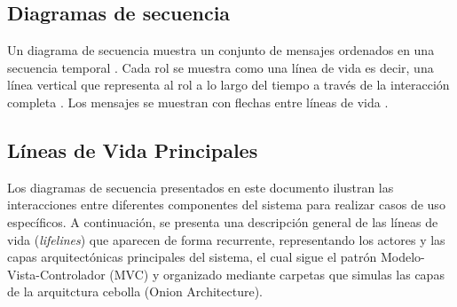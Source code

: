 
\subsection{Diagramas de secuencia}
Un diagrama de secuencia muestra un conjunto de mensajes ordenados en una secuencia temporal . Cada rol se muestra como una línea de vida es decir, una línea vertical que representa al rol a lo largo del tiempo a través de la interacción completa . Los mensajes se muestran con flechas entre líneas de vida .

\subsection*{Líneas de Vida Principales}

Los diagramas de secuencia presentados en este documento ilustran las interacciones entre diferentes componentes del sistema para realizar casos de uso específicos. A continuación, se presenta una descripción general de las líneas de vida (\textit{lifelines}) que aparecen de forma recurrente, representando los actores y las capas arquitectónicas principales del sistema, el cual sigue el patrón Modelo-Vista-Controlador (MVC) y organizado mediante carpetas que simulas las capas de la arquitctura cebolla (Onion Architecture).

